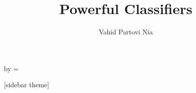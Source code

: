 

\usepackage{listings}
\usepackage{xcolor}
\def \y {\mathbf y}
\def \z {\mathbf z}
\def \Z {\mathbf Z}
\def \X {\mathbf X}
\def \A {\mathbf A}
\def \t {^\top}
\def \inv {^ {-1}}
\def \x {\mathbf x}
\def \bbeta {\boldsymbol \beta}
\def \eeps {\boldsymbol \varepsilon}
\def \TV {\mathrm{TV}}
\def \Radio {\mathrm{Radio}}
\def \Newspaper {\mathrm{Newspaper}}
\def \Sales {\mathrm{Sales}}
\def \Balance {\mathrm{Balance}}
\def \Default {\mathrm{Default}}
\def \M {\mathcal{M}}

\def \r {\mathbf{r}}
\def \e {\mathbf{e}}

\def \RSS {\mathrm{RSS}}

\def \E {\mathrm{E}}
\def \P {\mathbf{P}}

\def \V {\mathrm{V}}
\def \cor {\mathrm{cor}}

\def \SSigma {\boldsymbol{\Sigma}}
\def \LLambda {\boldsymbol{\Lambda}}
\def \pphi {\boldsymbol{\phi}}
\def \PPhi {\boldsymbol{\Phi}}
\def \mmu {\boldsymbol{\mu}}
\def \ttheta {\boldsymbol{\theta}}




\title[]{Powerful Classifiers}   
\author[]{Vahid Partovi Nia} 
\date{}


\makeatletter
  \begin{frame}[plain]
    \hspace*{-\beamer@leftsidebar}%
    \advance\textwidth by \beamer@leftsidebar\relax
    \beamer@leftsidebar=\z@
    \begin{minipage}{\textwidth}\par%
      \maketitle
    \end{minipage}
  \end{frame}
  \makeatother




[sidebar theme]

